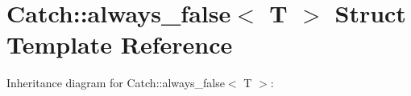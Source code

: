 \hypertarget{structCatch_1_1always__false}{}\section{Catch\+:\+:always\+\_\+false$<$ T $>$ Struct Template Reference}
\label{structCatch_1_1always__false}


Inheritance diagram for Catch\+:\+:always\+\_\+false$<$ T $>$\+:
